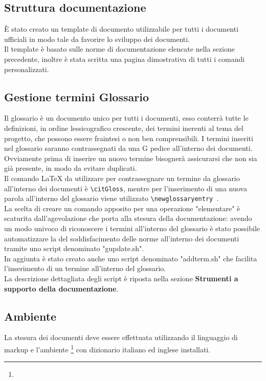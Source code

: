 \documentclass[NormeDiProgetto.tex]{subfiles}
\begin{document}
	\subsection{Struttura documentazione}
	\`{E} stato creato un template di documento utilizzabile per tutti i documenti ufficiali in modo tale da favorire lo sviluppo dei documenti.\\
	Il template è basato sulle norme di documentazione elencate nella sezione precedente, inoltre è stata scritta una pagina dimostrativa di tutti i comandi personalizzati.
	
	\subsection{Gestione termini Glossario}
	Il glossario è un documento unico per tutti i documenti, esso conterrà tutte le definizioni, in ordine lessicografico crescente, dei termini inerenti al tema del progetto, che possono essere fraintesi o non ben comprensibili. I termini inseriti nel glossario saranno contrassegnati da una G pedice all'interno dei documenti.\\
	Ovviamente prima di inserire un nuovo termine bisognerà assicurarsi che non sia già presente, in modo da evitare duplicati. \\
	Il comando \LaTeX{} da utilizzare per contrassegnare un termine da glossario all'interno dei documenti è \texttt{\textbackslash{}citGloss}, mentre per l'inserimento di una nuova parola all'interno del glossario viene utilizzato \texttt{\textbackslash{}newglossaryentry }.\\
	La scelta di creare un comando apposito per una operazione "elementare" è scaturita dall'agevolazione che porta alla stesura della documentazione: avendo un modo univoco di riconoscere i termini all'interno del glossario è stato possibile automatizzare la  del soddisfacimento delle norme all'interno dei documenti tramite uno script denominato "gupdate.sh".\\
	In aggiunta è stato creato anche uno script denominato "addterm.sh" che facilita l'inserimento di un termine all'interno del glossario.\\
	La descrizione dettagliata degli script è riposta nella sezione \textbf{Strumenti a supporto della documentazione}.
	
	
	\subsection{Ambiente}
	La stesura dei documenti deve essere effettuata utilizzando il linguaggio di markup   e l'ambiente \footnote{} con dizionario italiano ed inglese installati.
	
\end{document}
